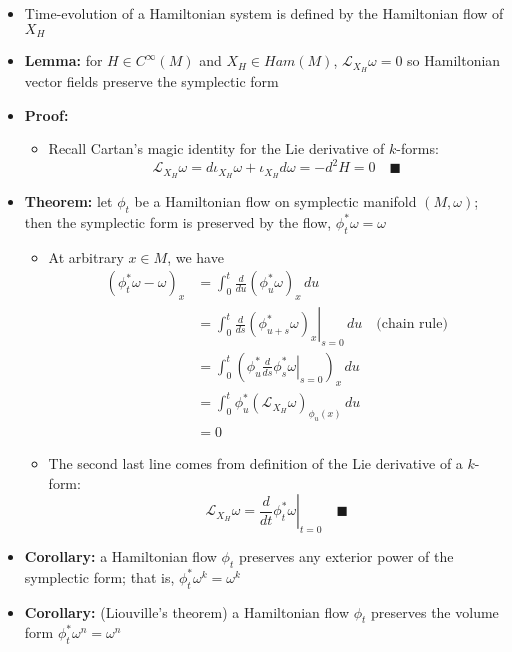 \documentclass[12pt,a4paper]{article}
\numberwithin{equation}{section}
\begin{document}
\begin{itemize}
		\item Time-evolution of a Hamiltonian system is defined by the Hamiltonian flow of $X_{H}$
		\item \textbf{Lemma:} for $H\in C^{\infty}(M)$ and $X_{H}\in Ham(M)$, $\mathcal{L}_{X_{H}}\omega=0$ so Hamiltonian vector fields preserve the symplectic form
		\item \textbf{Proof:}
		\begin{itemize}
			\item Recall Cartan's magic identity for the Lie derivative of $k$-forms:
			\begin{equation}
				\mathcal{L}_{X_{H}}\omega=d\iota_{X_{H}}\omega+\iota_{X_{H}}d\omega=-d^{2}H=0\quad\blacksquare
			\end{equation}
		\end{itemize}
		\item \textbf{Theorem:} let $\phi_{t}$ be a Hamiltonian flow on symplectic manifold $(M,\omega)$; then the symplectic form is preserved by the flow, $\phi^{*}_{t}\omega=\omega$
		\begin{itemize}
			\item At arbitrary $x\in M$, we have
			\begin{equation}
				\begin{aligned}
					(\phi_{t}^{*}\omega-\omega)_{x}&=\int_{0}^{t}\frac{d}{du}(\phi_{u}^{*}\omega)_{x}\,du\\&=\left.\int_{0}^{t}\frac{d}{ds}\left(\phi^{*}_{u+s}\omega\right)_{x}\right\rvert_{s=0}\,du\quad\text{(chain rule)}\\&=\int_{0}^{t}\left(\left.\phi_{u}^{*}\frac{d}{ds}\phi^{*}_{s}\omega\right\rvert_{s=0}\right)_{x}\,du\\&=\int_{0}^{t}\phi_{u}^{*}(\mathcal{L}_{X_{H}}\omega)_{\phi_{u}(x)}\,du\\&=0
				\end{aligned}
			\end{equation}
			\item The second last line comes from definition of the Lie derivative of a $k$-form:
			\begin{equation}
				\mathcal{L}_{X_{H}}\omega=\left.\frac{d}{dt}\phi_{t}^{*}\omega\right\rvert_{t=0}\quad\blacksquare
			\end{equation}
		\end{itemize}
		\item \textbf{Corollary:} a Hamiltonian flow $\phi_{t}$ preserves any exterior power of the symplectic form; that is, $\phi_{t}^{*}\omega^{k}=\omega^{k}$
		\item \textbf{Corollary:} (Liouville's theorem) a Hamiltonian flow $\phi_{t}$ preserves the volume form $\phi_{t}^{*}\omega^{n}=\omega^{n}$

\end{itemize}
\end{document}
